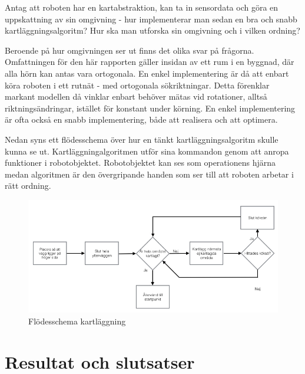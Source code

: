 \documentclass[a4paper,12pt,fleqn]{article}
\begin{document}
Antag att roboten har en kartabstraktion, kan ta in sensordata och göra en uppskattning av sin omgivning - hur implementerar man sedan en bra och snabb kartläggningsalgoritm? Hur ska man utforska sin omgivning och i vilken ordning? 

Beroende på hur omgivningen ser ut finns det olika svar på frågorna. Omfattningen för den här rapporten gäller insidan av ett rum i en byggnad, där alla hörn kan antas vara ortogonala. En enkel implementering är då att enbart köra roboten i ett rutnät - med ortogonala sökriktningar. Detta förenklar markant modellen då vinklar enbart behöver mätas vid rotationer, alltså riktningsändringar, istället för konstant under körning. En enkel implementering är ofta också en snabb implementering, både att realisera och att optimera. 

Nedan syns ett flödesschema över hur en tänkt kartläggningsalgoritm skulle kunna se ut. Kartläggningalgoritmen utför sina kommandon genom att anropa funktioner i robotobjektet. Robotobjektet kan ses som operationens hjärna medan algoritmen är den övergripande handen som ser till att roboten arbetar i rätt ordning. 

\begin{figure}[htp] %
  \begin{center}
  \includegraphics[keepaspectratio=true,scale=0.5]{../../Designspec/Flode_kartritning.jpg}  %
  \end{center}
  \caption{Flödesschema kartläggning} %
  \label{fig:algoritm} %
\end{figure}

\newpage
\section{Resultat och slutsatser}
\end{document}
